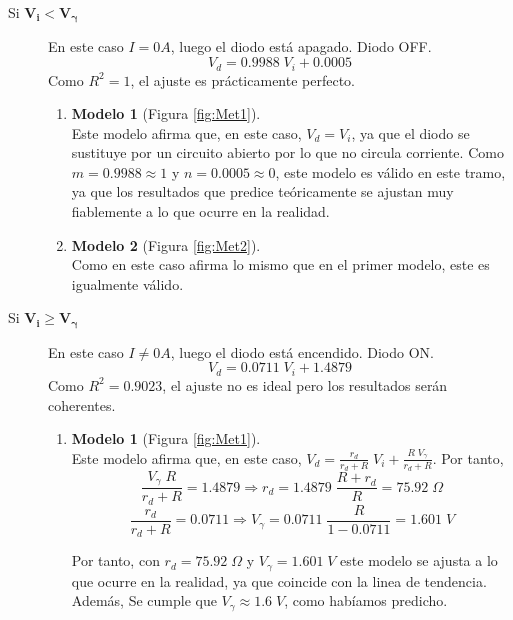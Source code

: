 \begin{description}
    \item[Si $\mathbf{V_i < V_\gamma}$] En este caso $I=0 A$, luego el diodo está apagado. Diodo OFF.\\
    \begin{equation}
        V_d = 0.9988 \;V_i + 0.0005
    \end{equation}
    Como $R^2=1$, el ajuste es prácticamente perfecto.
    \begin{enumerate}
        \item \textbf{Modelo 1} (Figura \ref{fig:Met1}).\\
        Este modelo afirma que, en este caso, $V_d = V_i$, ya que el diodo se sustituye por un circuito abierto por lo que no circula corriente. Como $m=0.9988\approx1$ y $n=0.0005\approx0$, este modelo es válido en este tramo, ya que los resultados que predice teóricamente se ajustan muy fiablemente a lo que ocurre en la realidad.
        \item \textbf{Modelo 2} (Figura \ref{fig:Met2}).\\
        Como en este caso afirma lo mismo que en el primer modelo, este es igualmente válido.
    \end{enumerate}

    \item[Si $\mathbf{V_i \geq V_\gamma}$] En este caso $I\neq0 A$, luego el diodo está encendido. Diodo ON.\\
    \begin{equation}
        V_d = 0.0711\;V_i + 1.4879
    \end{equation}
    Como $R^2 = 0.9023$, el ajuste no es ideal pero los resultados serán coherentes.
    \begin{enumerate}
        \item \textbf{Modelo 1} (Figura \ref{fig:Met1}).\\
        Este modelo afirma que, en este caso, $V_d = \frac{r_d}{r_d+R}\;V_i + \frac{R\;V_\gamma}{r_d+R}$.
        Por tanto,
        $$
            \frac{V_\gamma \; R}{r_d + R} = 1.4879 \Longrightarrow r_d = 1.4879\;\frac{R+r_d}{R} = 75.92\;\Omega
        $$
        $$
            \frac{r_d}{r_d + R} = 0.0711 \Longrightarrow V_\gamma = 0.0711\;\frac{R}{1-0.0711} = 1.601\; V
        $$
        
        Por tanto, con $r_d = 75.92\;\Omega$ y $V_\gamma = 1.601\;V$ este modelo se ajusta a lo que ocurre en la realidad, ya que coincide con la linea de tendencia. Además, Se cumple que $V_\gamma \approx 1.6\;V$, como habíamos predicho.
        

\end{enumerate}
\end{description}
